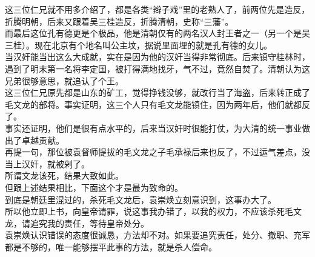 \begin{multicols}{\theparacolNo}
这三位仁兄就不用多介绍了，都是各类“辫子戏”里的老熟人了，前两位先是造反，折腾明朝，后来又跟着吴三桂造反，折腾清朝，史称“三藩”。\\

而最后这位孔有德更是个极品，他是清朝仅有的两名汉人封王者之一（另一个是吴三桂）。现在北京有个地名叫公主坟，据说里面埋的就是孔有德的女儿。\\

当汉奸能当出这么大成就，实在是因为他的汉奸当得非常彻底。后来镇守桂林时，遇到了明末第一名将李定国，被打得满地找牙，气不过，竟然自焚了。清朝认为这兄弟很够意思，就追认了个王。\\

这三位仁兄原先都是山东的矿工，觉得挣钱没够，就改行当了海盗，后来转正成了毛文龙的部将。事实证明，这三个人只有毛文龙能镇住，因为两年后，他们就都反了。\\

事实还证明，他们是很有点水平的，后来当汉奸时很能打仗，为大清的统一事业做出了卓越贡献。\\

再提一句，那位被袁督师提拔的毛文龙之子毛承禄后来也反了，不过运气差点，没当上汉奸，就被剁了。\\

所谓文龙该死，结果大致如此。\\

但跟上述结果相比，下面这个才是最为致命的。\\

到底是朝廷里混过的，杀死毛文龙后，袁崇焕立刻意识到，这事办大了。\\

所以他立即上书，向皇帝请罪，说这事我办错了，以我的权力，不应该杀死毛文龙，请追究我的责任，等待皇帝处分。\\

袁崇焕认识错误的态度很诚恳，方法却不对。如果要追究责任，处分、撤职、充军都是不够的，唯一能够摆平此事的方法，就是杀人偿命。\\
\ifnum{}
	\end{multicols}
\fi
\newpage
